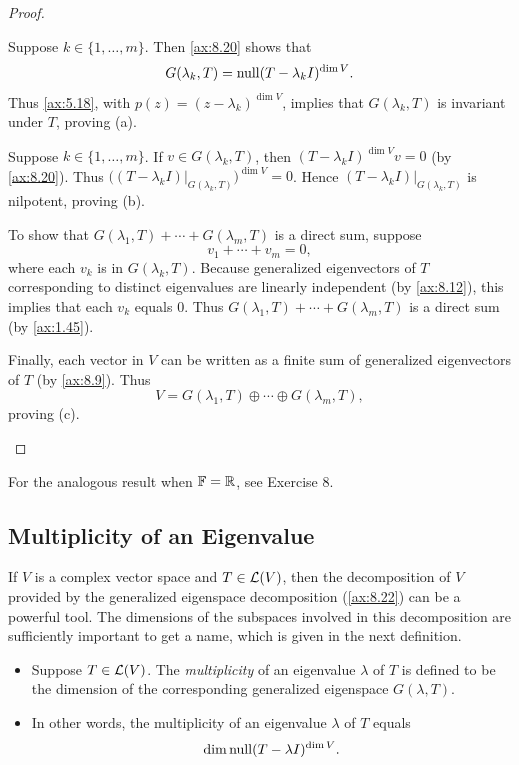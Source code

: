 \begin{proof}\leavevmode
\begin{parts}
\item Suppose $k\in\{1,\dots,m\}$. Then \ref{ax:8.20} shows that
  \[ G(\lambda_k,T) = \operatorname{null}(T-\lambda_kI)^{\operatorname{dim} V}. \]
  Thus \ref{ax:5.18}, with $p(z)=(z-\lambda_k)^{\dim V}$, implies that
  $G(\lambda_k,T)$ is invariant under $T$, proving (a).
\item Suppose $k\in\{1,\dots,m\}$. If $v\in G(\lambda_k,T)$, then
  $(T-\lambda_kI)^{\dim V}v=0$ (by \ref{ax:8.20}). Thus
  $\bigl((T-\lambda_kI)|_{G(\lambda_k,T)}\bigr)^{\dim V}=0$. Hence
  $(T-\lambda_kI)|_{G(\lambda_k,T)}$ is nilpotent, proving (b).
\item To show that $G(\lambda_1,T)+\cdots+G(\lambda_m,T)$ is a direct sum,
  suppose
  \[ v_1+\cdots+v_m = 0, \]
  where each $v_k$ is in $G(\lambda_k,T)$. Because generalized eigenvectors of
  $T$ corresponding to distinct eigenvalues are linearly independent (by
  \ref{ax:8.12}), this implies that each $v_k$ equals $0$. Thus
  $G(\lambda_1,T)+\cdots+G(\lambda_m,T)$ is a direct sum (by \ref{ax:1.45}).

  Finally, each vector in $V$ can be written as a finite sum of generalized
  eigenvectors of $T$ (by \ref{ax:8.9}). Thus
  \[ V = G(\lambda_1,T)\oplus\cdots\oplus G(\lambda_m,T), \]
  proving (c).\qedhere
\end{parts}
\end{proof}

For the analogous result when $\mathbb{F}=\mathbb{R}$, see Exercise 8.

\subsection{Multiplicity of an Eigenvalue}

If $V$ is a complex vector space and $T\in\mathcal{L}(V)$, then the decomposition of
$V$ provided by the generalized eigenspace decomposition (\ref{ax:8.22}) can be
a powerful tool. The dimensions of the subspaces involved in this decomposition
are sufficiently important to get a name, which is given in the next
definition.

\begin{definition}[Multiplicity]\label{ax:8.23}\leavevmode
\begin{itemize}
\item Suppose $T\in\mathcal{L}(V)$. The \emph{multiplicity} of an eigenvalue $\lambda$
  of $T$ is defined to be the dimension of the corresponding generalized
  eigenspace $G(\lambda,T)$.
\item In other words, the multiplicity of an eigenvalue $\lambda$ of $T$ equals
  \[ \operatorname{dim}\operatorname{null}(T-\lambda I)^{\operatorname{dim} V}. \]
\end{itemize}
\end{definition}

